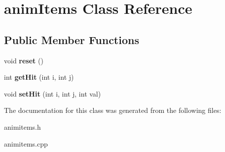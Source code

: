 \hypertarget{classanim_items}{\section{anim\-Items Class Reference}
\label{classanim_items}
}
\subsection*{Public Member Functions}
\begin{DoxyCompactItemize}
\item 
\hypertarget{classanim_items_a41a97b9ae416051cb9203499577c77af}{void {\bfseries reset} ()}\label{classanim_items_a41a97b9ae416051cb9203499577c77af}

\item 
\hypertarget{classanim_items_a8da8e0816cfb6288fbd122e5f2e1b6ce}{int {\bfseries get\-Hit} (int i, int j)}\label{classanim_items_a8da8e0816cfb6288fbd122e5f2e1b6ce}

\item 
\hypertarget{classanim_items_a1764237122104d10d12b4300fbe091fe}{void {\bfseries set\-Hit} (int i, int j, int val)}\label{classanim_items_a1764237122104d10d12b4300fbe091fe}

\end{DoxyCompactItemize}


The documentation for this class was generated from the following files\-:\begin{DoxyCompactItemize}
\item 
animitems.\-h\item 
animitems.\-cpp\end{DoxyCompactItemize}
